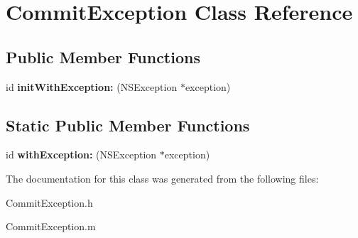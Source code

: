 \hypertarget{interface_commit_exception}{
\section{\-Commit\-Exception \-Class \-Reference}
\label{interface_commit_exception}
}
\subsection*{\-Public \-Member \-Functions}
\begin{DoxyCompactItemize}
\item 
\hypertarget{interface_commit_exception_a2d34529345849ca536260cd09d29cbc1}{
id {\bfseries init\-With\-Exception\-:} (\-N\-S\-Exception $\ast$exception)}
\label{interface_commit_exception_a2d34529345849ca536260cd09d29cbc1}

\end{DoxyCompactItemize}
\subsection*{\-Static \-Public \-Member \-Functions}
\begin{DoxyCompactItemize}
\item 
\hypertarget{interface_commit_exception_a21abfb57fa3bdd78acc84929a2b9a1a1}{
id {\bfseries with\-Exception\-:} (\-N\-S\-Exception $\ast$exception)}
\label{interface_commit_exception_a21abfb57fa3bdd78acc84929a2b9a1a1}

\end{DoxyCompactItemize}


\-The documentation for this class was generated from the following files\-:\begin{DoxyCompactItemize}
\item 
\-Commit\-Exception.\-h\item 
\-Commit\-Exception.\-m\end{DoxyCompactItemize}
